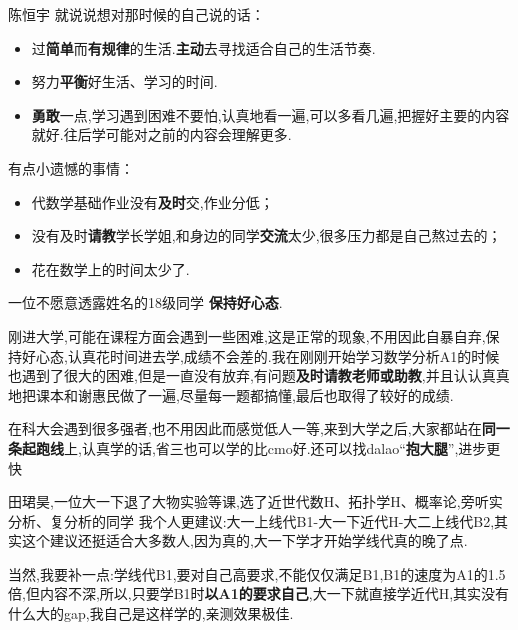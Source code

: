 \documentclass[pdf]{beamer}
\numberwithin{equation}{section}
\theoremstyle{plain}
\theoremstyle{plain}
\theoremstyle{plain}
\theoremstyle{remark}
\begin{document}
\begin{frame}
\begin{block}{陈恒宇}
\hspace*{20pt}就说说想对那时候的自己说的话：
\begin{itemize}
	\item 过\textbf{简单}而\textbf{有规律}的生活.\textbf{主动}去寻找适合自己的生活节奏.
	\item 努力\textbf{平衡}好生活、学习的时间.
	\item \textbf{勇敢}一点,学习遇到困难不要怕,认真地看一遍,可以多看几遍,把握好主要的内容就好.往后学可能对之前的内容会理解更多.
\end{itemize}
\end{block}
\begin{block}{}
\hspace*{20pt}有点小遗憾的事情：
\begin{itemize}
	\item 代数学基础作业没有\textbf{及时}交,作业分低；
	\item 没有及时\textbf{请教}学长学姐,和身边的同学\textbf{交流}太少,很多压力都是自己熬过去的；
	\item 花在数学上的时间太少了.
\end{itemize}
\end{block}
\end{frame}
\begin{frame}
\begin{block}{一位不愿意透露姓名的18级同学}
	\hspace*{20pt}\textbf{保持好心态}.
	
	\hspace*{20pt}刚进大学,可能在课程方面会遇到一些困难,这是正常的现象,不用因此自暴自弃,保持好心态,认真花时间进去学,成绩不会差的.我在刚刚开始学习数学分析A1的时候也遇到了很大的困难,但是一直没有放弃,有问题\textbf{及时请教老师或助教},并且认认真真地把课本和谢惠民做了一遍,尽量每一题都搞懂,最后也取得了较好的成绩.
		
	\hspace*{20pt}在科大会遇到很多强者,也不用因此而感觉低人一等,来到大学之后,大家都站在\textbf{同一条起跑线}上,认真学的话,省三也可以学的比cmo好.还可以找dalao“\textbf{抱大腿}”,进步更快
	
\end{block}
\end{frame}
\begin{frame}
\begin{block}{田珺昊,一位大一下退了大物实验等课,选了近世代数H、拓扑学H、概率论,旁听实分析、复分析的同学}
	\hspace*{20pt}我个人更建议:大一上线代B1-大一下近代H-大二上线代B2,其实这个建议还挺适合大多数人,因为真的,大一下学才开始学线代真的晚了点.
	
	\hspace*{20pt}当然,我要补一点:学线代B1,要对自己高要求,不能仅仅满足B1,B1的速度为A1的1.5倍,但内容不深,所以,只要学B1时\textbf{以A1的要求自己},大一下就直接学近代H,其实没有什么大的gap,我自己是这样学的,亲测效果极佳.
\end{block}
\end{frame}






\end{document}
